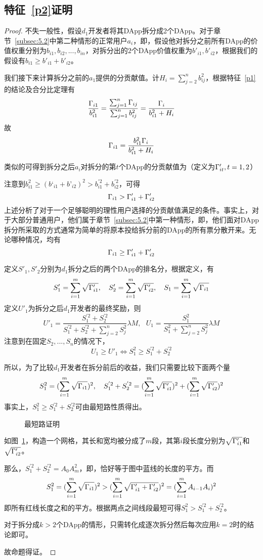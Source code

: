 \subsection{特征~\ref{p2}证明}
\label{subsection:proof2}
\begin{proof}
	 不失一般性，假设$d_1$开发者将其DApp拆分成2个DApp。对于章节~\ref{subsec:5.2}中第二种情形的正常用户$a_i$，即，假设他对拆分之前所有DApp的价值权重分别为$b_{i1},b_{i2},...,b_{in}$，对拆分出的$2$个DApp价值权重为$b'_{i1},b'_{i2}$，根据我们的假设有$b_{i1} \geq b'_{i1}+b'_{i2}$。

	 我们接下来计算拆分之前的$a_1$提供的分贡献值。计$H_i = \sum_{j=2}^n b_{ij}^2$，根据特征~\ref{p1}的结论及合分比定理有
	 $$\frac{\Gamma_{i1}}{b_{i1}^2} = \frac{\sum_{j=1}^n \Gamma_{ij}}{\sum_{j=1}^n b_{ij}^2} = \frac{\Gamma_i}{b_{i1}^2+H_i}$$
	 故
	 $$\Gamma_{i1}=\frac{b_{i1}^2\Gamma_i}{b_{i1}^2+H_i}$$

     类似的可得到拆分之后$a_i$对拆分的第$t$个DApp的分贡献值为（定义为$\Gamma'_{it},t=1,2$）

	 注意到$b_{i1}^2 \geq (b‘_{i1}+b’_{i2})^2 >b_{i1}^{'2}+b_{i2}^{'2}$，可得
	 $$\Gamma_{i1} > \Gamma'_{i1}+\Gamma'_{i2}$$
	 上述分析了对于一个足够聪明的理性用户选择的分贡献值满足的条件。事实上，对于大部分普通用户，他们属于章节~\ref{subsec:5.2}中第一种情形，即，他们面对DApp拆分所采取的方式通常为简单的将原本投给拆分前的DApp的所有票分散开来。无论哪种情况，均有
	 	$$\Gamma_{i1} \geq \Gamma'_{i1}+\Gamma'_{i2}$$

	 定义$S'_1,S'_2$分别为$d_1$拆分之后的两个DApp的排名分，根据定义，有
	 $$S'_1 =  \sum_{i=1}^m \sqrt{\Gamma'_{i1}},~~~S'_2 =  \sum_{i=1}^m \sqrt{\Gamma'_{i2}},~~~S_1 = \sum_{i=1}^m \sqrt{\Gamma_{i1}}$$
	 定义$U'_1$为拆分之后$d_1$开发者的最终奖励，则
	 $$U'_1=\frac{S_1^{'2}+S_2^{'2}}{S_1^{'2}+S_2^{'2}+\sum_{j=2}^n S_j^2} \lambda M,~~~U_1=\frac{S^2_1}{S_1^2+\sum_{j=2}^n S_j^2} \lambda M$$
	 注意到在固定$S_2,...,S_n$的情况下，
	 $$ U_1 \geq U'_1 \Leftrightarrow S_1^2 \geq S_1^{'2}+S_2^{'2}$$

	 所以，为了比较$d_1$开发者在拆分前后的收益，我们只需要比较下面两个量
	 $$S_1^2 = (\sum_{i=1}^m \sqrt{\Gamma_{i1}})^2,~~~S_1^{'2}+S_2^{'2}=  (\sum_{i=1}^m \sqrt{\Gamma'_{i1}})^2+(\sum_{i=1}^m \sqrt{\Gamma'_{i2}})^2$$
	 事实上，$S_1^2 \geq S_1^{'2}+S_2^{'2}$可由最短路性质得出。
	 \begin{figure}
	 	\centering
    
	 	\caption{最短路证明 \label{fig:path}}
	 \end{figure}
	 
	 如图~\ref{fig:path}，构造一个网格，其长和宽均被分成了$m$段，其第$i$段长度分别为$\sqrt{\Gamma'_{i1}}$和$\sqrt{\Gamma'_{i2}}$。

	 那么，$S_1^{'2}+S_2^{'2}=A_0A_m^2$，即，恰好等于图中蓝线的长度的平方。而
	 $$S_1^2 = (\sum_{i=1}^m \sqrt{\Gamma_{i1}})^2 > (\sum_{i=1}^m \sqrt{\Gamma'_{i1}+\Gamma'_{i2}})^2 = (\sum_{i=1}^m A_{i-1}A_i)^2$$
	 即所有红线长度之和的平方。根据两点之间线段最短可得$S_1^2 >S_1^{'2}+S_2^{'2}$。

	 对于拆分成$k>2$个DApp的情形，只需转化成逐次拆分然后每次应用$k=2$时的结论即可。

	 故命题得证。
\end{proof}


